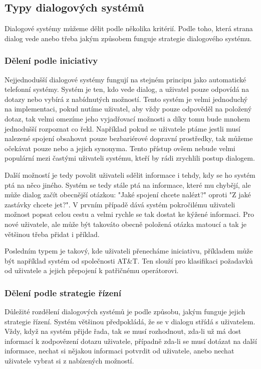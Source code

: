 \subsection{Typy dialogových systémů}

Dialogové systémy můžeme dělit podle několika kritérií. Podle toho, která
strana dialog vede anebo třeba jakým způsobem funguje strategie dialogového
systému.

\subsubsection{Dělení podle iniciativy}

Nejjednodušší dialogové systémy fungují na stejném principu jako automatické
telefonní systémy. Systém je ten, kdo vede dialog, a uživatel pouze odpovídá na
dotazy nebo vybírá z nabídnutých možností. Tento systém je velmi jednoduchý na
implementaci, pokud nutíme uživatel, aby vždy pouze odpověděl na položený
dotaz, tak velmi omezíme jeho vyjadřovací možnosti a díky tomu bude mnohem
jednodušší rozpoznat co řekl. Například pokud se uživatele ptáme jestli musí
nalezené spojení obsahovat pouze bezbariérové dopravní prostředky, tak můžeme
očekávat pouze  nebo  a jejich synonyma. Tento přístup ovšem
nebude velmi populární mezi častými uživateli systému, kteří by rádi zrychlili
postup dialogem.

Další možností je tedy povolit uživateli sdělit informace i tehdy, kdy se ho
systém ptá na něco jiného. Systém se tedy stále ptá na informace, které mu
chybějí, ale může dialog začít obecnější otázkou: "Jaké spojení chcete nalézt?"
oproti "Z jaké zastávky chcete jet?". V prvním případě dává systém pokročilému
uživateli možnost popsat celou cestu a velmi rychle se tak dostat ke kýžené
informaci. Pro nové uživatele, ale může být takováto obecně položená otázka
matoucí a tak je většinou třeba přidat i příklad.

Posledním typem je takový, kde uživateli přenecháme iniciativu, příkladem může
být například systém  \cite{gorin1997may} od
společnosti AT\&T. Ten slouží pro klasifikaci požadavků od uživatele a jejich
přepojení k patřičnému operátorovi.

\subsubsection{Dělení podle strategie řízení}

Důležité rozdělení dialogových systémů je podle způsobu, jakým funguje jejich
strategie řízení. Systém většinou předpokládá, že se v dialogu střídá s
uživatelem. Vždy, když na systém přijde řada, tak se musí rozhodnout, zda-li už
má dost informací k zodpovězení dotazu uživatele, případně zda-li se musí
dotázat na další informace, nechat si nějakou informaci potvrdit od uživatele,
anebo nechat uživatele vybrat si z nabízených možností.

